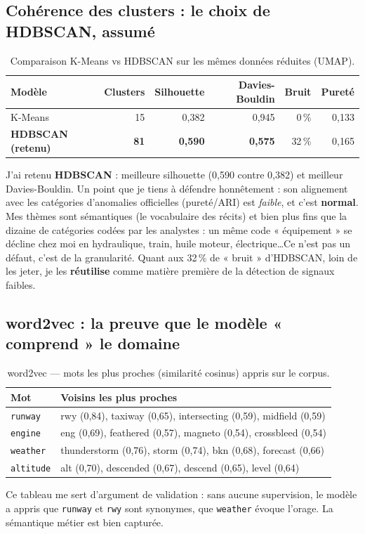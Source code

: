 \documentclass[11pt,a4paper]{article}
\begin{document}
\subsection{Cohérence des clusters : le choix de HDBSCAN, assumé}
\begin{table}[h]\centering\small
\caption{Comparaison K-Means vs HDBSCAN sur les mêmes données réduites (UMAP).}\label{tab:clust}
\begin{tabular}{lrrrrr}
\toprule
\textbf{Modèle} & \textbf{Clusters} & \textbf{Silhouette} & \textbf{Davies-Bouldin} & \textbf{Bruit} & \textbf{Pureté} \\
\midrule
K-Means & 15 & 0,382 & 0,945 & 0\,\% & 0,133 \\
\textbf{HDBSCAN (retenu)} & \textbf{81} & \textbf{0,590} & \textbf{0,575} & 32\,\% & 0,165 \\
\bottomrule
\end{tabular}
\end{table}
J'ai retenu \textbf{HDBSCAN} : meilleure silhouette (0,590 contre 0,382) et meilleur
Davies-Bouldin. Un point que je tiens à défendre honnêtement : son alignement avec les
catégories d'anomalies officielles (pureté/ARI) est \emph{faible}, et c'est \textbf{normal}.
Mes thèmes sont sémantiques (le vocabulaire des récits) et bien plus fins que la dizaine
de catégories codées par les analystes : un même code « équipement » se décline chez moi
en hydraulique, train, huile moteur, électrique\ldots Ce n'est pas un défaut, c'est de la
granularité. Quant aux 32\,\% de « bruit » d'HDBSCAN, loin de les jeter, je les
\textbf{réutilise} comme matière première de la détection de signaux faibles.

\subsection{word2vec : la preuve que le modèle « comprend » le domaine}
\begin{table}[h]\centering\small
\caption{word2vec — mots les plus proches (similarité cosinus) appris sur le corpus.}\label{tab:w2v}
\begin{tabular}{ll}
\toprule
\textbf{Mot} & \textbf{Voisins les plus proches} \\
\midrule
\texttt{runway}   & rwy (0,84), taxiway (0,65), intersecting (0,59), midfield (0,59) \\
\texttt{engine}   & eng (0,69), feathered (0,57), magneto (0,54), crossbleed (0,54) \\
\texttt{weather}  & thunderstorm (0,76), storm (0,74), bkn (0,68), forecast (0,66) \\
\texttt{altitude} & alt (0,70), descended (0,67), descend (0,65), level (0,64) \\
\bottomrule
\end{tabular}
\end{table}
Ce tableau me sert d'argument de validation : sans aucune supervision, le modèle a appris
que \texttt{runway} et \texttt{rwy} sont synonymes, que \texttt{weather} évoque l'orage. La
sémantique métier est bien capturée.
\end{document}
